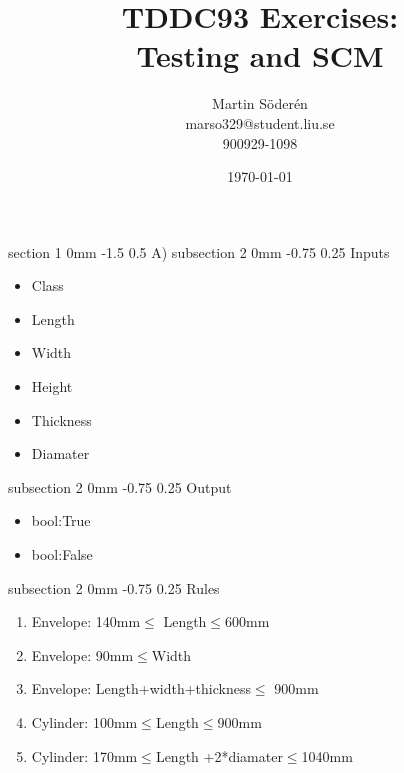 \documentclass[a4paper,11pt]{article}
\makeatletter
\renewcommand{\section}{\@startsection
   {section}%
   {1}%
   {0mm}%
   {-1.5\baselineskip}%
   {0.5\baselineskip}%
   {\sffamily\bfseries\upshape\normalsize}}%
\renewcommand{\subsection}{\@startsection
   {subsection}%
   {2}%
   {0mm}%
   {-0.75\baselineskip}%
   {0.25\baselineskip}%
   {\rmfamily\normalfont\slshape\normalsize}}%
\makeatother
\begin{document}
\begin{titlepage}
\title{TDDC93 Exercises:\\
Testing and SCM}
\author{Martin Söderén\\ marso329@student.liu.se\\900929-1098}
\date{\today}
\maketitle




\vfill %

\thispagestyle{empty}

\end{titlepage}
\section{A)}
\subsection{Inputs}
\begin{itemize}
\item Class
\item Length
\item Width
\item Height
\item Thickness
\item Diamater
\end{itemize}
\subsection{Output}
\begin{itemize}
\item bool:True
\item bool:False
\end{itemize}
\subsection{Rules}
\begin{enumerate}
\item Envelope: 140mm$\leq$ Length$\leq$600mm
\item Envelope: 90mm$\leq$Width
\item Envelope: Length+width+thickness$\leq$ 900mm
\item Cylinder: 100mm$\leq$Length$\leq$900mm
\item Cylinder: 170mm$\leq$Length +2*diamater$\leq$1040mm
\end{enumerate}
\end{document}
